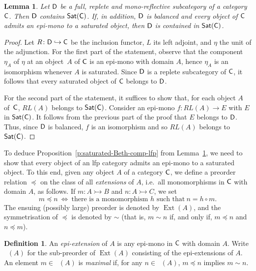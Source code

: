 \documentclass[a4paper,10pt,reqno]{amsart}
\newtheorem{lemma}[theorem]{Lemma}
\theoremstyle{definition}
\newtheorem{definition}[theorem]{Definition}
\theoremstyle{remark}
\newcommand{\cat}{{\sf C}}								%
\newcommand{\catt}{{\sf D}}								%
\newcommand{\Sat}{{\sf Sat}}								%
\newcommand{\into}{\hookrightarrow}						%
\newcommand{\emb}{\rightarrowtail}							%
\DeclareMathOperator{\Ext}{Ext}						%
\DeclareMathOperator{\EExt}{Ext_{p}}					%
\begin{document}
\begin{lemma}\label{l:mono-refl-sat}
Let $\catt$ be a full, replete and mono-reflective subcategory of a category~$\cat$. Then $\catt$ contains $\Sat(\cat)$. If, in addition, $\catt$ is balanced and every object of $\cat$ admits an epi-mono to a saturated object, then $\catt$ is contained in $\Sat(\cat)$.
\end{lemma}
%
\begin{proof}
Let $R\colon \catt\into \cat$ be the inclusion functor, $L$ its left adjoint, and $\eta$ the unit of the adjunction.
%
For the first part of the statement, observe that the component $\eta_{A}$ of $\eta$ at an object~$A$ of $\cat$ is an epi-mono with domain $A$, hence $\eta_{A}$ is an isomorphism whenever $A$ is saturated. Since $\catt$ is a replete subcategory of $\cat$, it follows that every saturated object of $\cat$ belongs to $\catt$.

For the second part of the statement, it suffices to show that, for each object $A$ of~$\cat$, $RL(A)$ belongs to $\Sat(\cat)$. Consider an epi-mono $f\colon RL(A)\to E$ with $E$ in $\Sat(\cat)$. It follows from the previous part of the proof that $E$ belongs to $\catt$. Thus, since $\catt$ is balanced, $f$ is an isomorphism and so $RL(A)$ belongs to $\Sat(\cat)$.
\end{proof}

To deduce Proposition~\ref{p:saturated-Beth-comp-lfp} from Lemma~\ref{l:mono-refl-sat}, we need to show that every object of an lfp category admits an epi-mono to a saturated object.
%
To this end, given any object $A$ of a category $\cat$, we define a preorder relation $\preccurlyeq$ on the class of all \emph{extensions} of $A$, i.e.\ all monomorphisms in $\cat$ with domain $A$, as follows. If $m\colon A\emb B$ and $n\colon A \emb C$, we set
\[
m\preccurlyeq n \ \Longleftrightarrow \ \text{there is a monomorphism $h$ such that} \ n=h\circ m.
\]
The ensuing (possibly large) preorder is denoted by $\Ext(A)$, and the symmetrisation of $\preccurlyeq$ is denoted by $\sim$ (that is, $m\sim n$ if, and only if, $m\preccurlyeq n$ and $n\preccurlyeq m$).

\begin{definition}\label{def:epi-extension}
An \emph{epi-extension} of $A$ is any epi-mono in $\cat$ with domain $A$. Write $\EExt(A)$ for the sub-preorder of $\Ext(A)$ consisting of the epi-extensions of $A$. An element $m\in \EExt(A)$ is \emph{maximal} if, for any $n\in \EExt(A)$, $m\preccurlyeq n$ implies $m\sim n$.
\end{definition}
\end{document}
